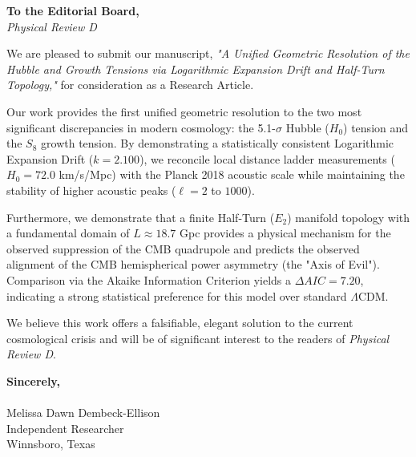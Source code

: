 \documentclass[12pt]{article}
\begin{document}
\noindent \textbf{To the Editorial Board,} \\
\textit{Physical Review D}

\vspace{1em}

\noindent We are pleased to submit our manuscript, \textit{"A Unified Geometric Resolution of the Hubble and Growth Tensions via Logarithmic Expansion Drift and Half-Turn Topology,"} for consideration as a Research Article.

\vspace{1em}

\noindent Our work provides the first unified geometric resolution to the two most significant discrepancies in modern cosmology: the 5.1-$\sigma$ Hubble ($H_0$) tension and the $S_8$ growth tension. By demonstrating a statistically consistent Logarithmic Expansion Drift ($k=2.100$), we reconcile local distance ladder measurements ($H_0 = 72.0$ km/s/Mpc) with the Planck 2018 acoustic scale while maintaining the stability of higher acoustic peaks ($\ell=2$ to $1000$).

\vspace{1em}

\noindent Furthermore, we demonstrate that a finite Half-Turn ($E_2$) manifold topology with a fundamental domain of $L \approx 18.7$ Gpc provides a physical mechanism for the observed suppression of the CMB quadrupole and predicts the observed alignment of the CMB hemispherical power asymmetry (the "Axis of Evil"). Comparison via the Akaike Information Criterion yields a $\Delta AIC = 7.20$, indicating a strong statistical preference for this model over standard $\Lambda$CDM.

\vspace{1em}

\noindent We believe this work offers a falsifiable, elegant solution to the current cosmological crisis and will be of significant interest to the readers of \textit{Physical Review D}.

\vspace{2em}

\noindent \textbf{Sincerely,} \\
\vspace{1em} \\
Melissa Dawn Dembeck-Ellison \\
Independent Researcher \\
Winnsboro, Texas
\end{document}
